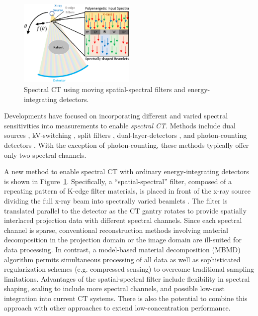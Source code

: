 \documentclass[]{spie}  %
\begin{document}
\begin{figure}
\centering
  \includegraphics[width=0.5\textwidth]{figures/system_figure_new}
\caption{Spectral CT using moving spatial-spectral filters and energy-integrating detectors.}
\label{fig:spectralCT}
\end{figure}

Developments have focused on incorporating different and varied spectral sensitivities into measurements to enable \emph{spectral CT}. Methods include dual sources \cite{flohr2006first}, kV-switching \cite{xu2009dual}, split filters \cite{rutt1980split}, dual-layer-detectors \cite{carmi2005material}, and photon-counting detectors \cite{schlomka2008experimental}. With the exception of photon-counting, these methods typically offer only two spectral channels.

A new method to enable spectral CT with ordinary energy-integrating detectors is shown in Figure~\ref{fig:spectralCT}.
Specifically, a ``spatial-spectral'' filter, composed of a repeating pattern of K-edge filter materials, is placed in front of the x-ray source dividing the full x-ray beam into spectrally varied beamlets \cite{stayman2018model}. 
The filter is translated parallel to the detector as the CT gantry rotates to provide spatially interlaced projection data with different spectral channels. Since each spectral channel is sparse, conventional reconstruction methods involving material decomposition in the projection domain or the image domain are ill-suited for data processing. In contrast, a model-based material decomposition (MBMD) algorithm \cite{tilley2018model} permits simultaneous processing of all data as well as sophisticated regularization schemes (e.g. compressed sensing) to overcome traditional sampling limitations. Advantages of the  spatial-spectral filter include flexibility in spectral shaping, scaling to include more spectral channels, and possible low-cost integration into current CT systems. There is also the potential to combine this approach with other approaches to extend low-concentration performance.
\end{document}

